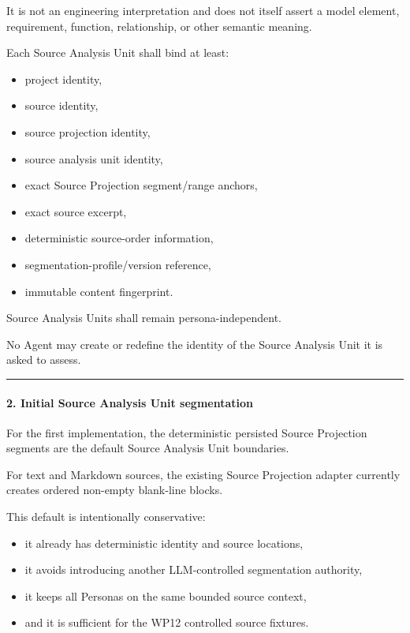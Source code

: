 It is not an engineering interpretation and does not itself assert a model element, requirement, function, relationship, or other semantic meaning.

Each Source Analysis Unit shall bind at least:

\begin{itemize}
\tightlist
\item
  project identity,
\item
  source identity,
\item
  source projection identity,
\item
  source analysis unit identity,
\item
  exact Source Projection segment/range anchors,
\item
  exact source excerpt,
\item
  deterministic source-order information,
\item
  segmentation-profile/version reference,
\item
  immutable content fingerprint.
\end{itemize}

Source Analysis Units shall remain persona-independent.

No Agent may create or redefine the identity of the Source Analysis Unit it is asked to assess.

\begin{center}\rule{0.5\linewidth}{0.5pt}\end{center}

\hypertarget{2-initial-source-analysis-unit-segmentation}{%
\paragraph{2. Initial Source Analysis Unit segmentation}\label{2-initial-source-analysis-unit-segmentation}}

For the first implementation, the deterministic persisted Source Projection segments are the default Source Analysis Unit boundaries.

For text and Markdown sources, the existing Source Projection adapter currently creates ordered non-empty blank-line blocks.

This default is intentionally conservative:

\begin{itemize}
\tightlist
\item
  it already has deterministic identity and source locations,
\item
  it avoids introducing another LLM-controlled segmentation authority,
\item
  it keeps all Personas on the same bounded source context,
\item
  and it is sufficient for the WP12 controlled source fixtures.
\end{itemize}

